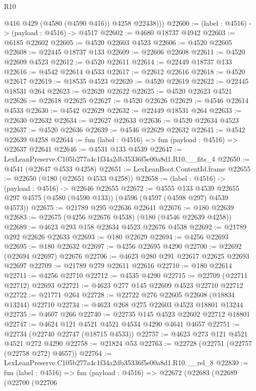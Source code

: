 \begin{lexlean}{R10}
\begin{coremodule}
          @416
          @429
          (@4580 (@4590 @416))
          @4258
          @22438)))
@22600 := (label : @4516) -> (payload : @4516) -> @4517
@22602 := @4680 @18737 @4942
@22603 := @6185 @22602
@22605 := @4520 @22603 @4523
@22606 := @4520 @22605
@22608 := @22445 @18737 @133
@22609 := @22606 @22608
@22611 := @4520 @22609 @4523
@22612 := @4520 @22611
@22614 := @22449 @18737 @133
@22616 := @4542 @22614 @4533
@22617 := @22612 @22616
@22618 := @4520 @22617
@22619 := @18535 @4523
@22620 := @4520 @22619
@22622 := @22445 @18531 @264
@22623 := @22620 @22622
@22625 := @4520 @22623 @4521
@22626 := @22618 @22625
@22627 := @4520 @22626
@22629 := @4546 @22614 @4533
@22630 := @4542 @22629
@22632 := @22449 @18531 @264
@22633 := @22630 @22632
@22634 := @22627 @22633
@22636 := @4520 @22634 @4523
@22637 := @4520 @22636
@22639 := @4546 @22629 @22632
@22641 := @4542 @22639 @4258
@22644 := fun (label : @4516) => fun (payload : @4516) => @22637 @22641
@22646 := @4531 @133 @4539
@22647 := LexLeanPreserve.C105b277a4c1f34a2db35336f5e00a8d1.R10.__fits_4
@22650 := @4541 (@22647 @4533 @4258)
@22651 := LexLeanBoot.ContentId.frame
@22655 := @22650 (@180 (@22651 @4533 @4258))
@22658 := (label : @4516) -> (payload : @4516) -> @22646 @22655
@22672 := @4555
    @133
    @4539
    @22655
    @297
    @4575
    (@4580 (@4590 @133))
    (@4596 (@4597 (@4598 @297) @4539 @4573))
@22675 := @21789 @295 @22636 @22641
@22676 := @180 @22639
@22683 := @22675 (@4256 @22676 @4538) (@180 (@4546 @22639 @4258))
@22689 := @4623 @293 @158 @22634 @4523 @22676 @4538
@22692 := @21789 @292 @22626 @22633
@22693 := @180 @22629
@22694 := @4256 @22693
@22695 := @180 @22632
@22697 := @4256 @22695 @4290
@22700 := @22692 (@22694 @22697) @22676
@22706 := @4623 @280 @291 @22617 @22625 @22693 @22697
@22709 := @21789 @279 @22611 @22616
@22710 := @180 @22614
@22711 := @4256 @22710
@22712 := @4535 @4290
@22715 := @22709 (@22711 @22712) @22693
@22721 := @4623 @277 @145 @22609 @4523 @22710 @22712
@22722 := @21771 @264
@22728 := @22722 @276 @22605 @22608 (@18834 @13244) @22710
@22734 := @4623 @268 @275 @22603 @4523 @18801 @13244
@22735 := @4607 @266
@22740 := @22735 @145 @4523 @22602 @22712 @18801
@22747 := @4624 @121 @4521 @4521 @4534 @4290 @4641 @4657
@22751 := @22734 (@22740 @22747 (@18715 @4533))
@22757 := @4623 @273 @121 @4521 @4521 @272 @4290
@22758 := @21824 @53
@22763 := @22728 (@22751 (@22757 (@22758 @272) @4657))
@22764 := LexLeanPreserve.C105b277a4c1f34a2db35336f5e00a8d1.R10.__rel_8
@22830 := fun (label : @4516) =>
  fun (payload : @4516) =>
  @22672
    (@22683
      (@22689
        (@22700
          (@22706

\end{coremodule}
\end{lexlean}
